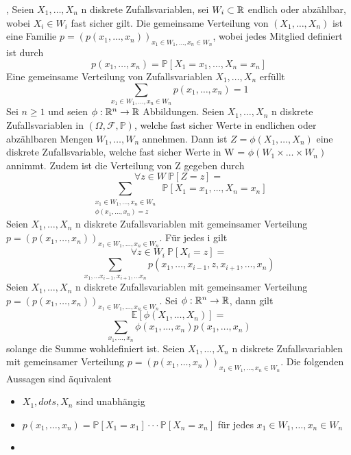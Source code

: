 \sep
\Def[5.1] \newline
Seien \(X_1, \dots , X_n\) n diskrete Zufallsvariablen, sei \( W_i \subset \mathbb{R} \) endlich oder abzählbar, wobei \(X_i \in W_i\) fast sicher gilt. Die gemeinsame Verteilung von \((X_1, \dots , X_n)\) ist eine Familie \( p = (p(x_1, \dots , x_n))_{x_1 \in W_1, \dots ,x_n \in W_n}\), wobei jedes Mitglied definiert ist durch \[ p(x_1, \dots , x_n) = \mathbb{P}[X_1 = x_1 , \dots , X_n = x_n]\]
\Satz[5.2] \newline
Eine gemeinsame Verteilung von Zufallsvariablen \( X_1, \dots , X_n\) erfüllt \[ \sum_{x_1 \in W_1, \dots , x_n \in W_n } p(x_1, \dots, x_n ) = 1\]
\Satz[5.3] \newline
Sei \( n \geq 1 \) und seien \( \phi : \mathbb{R}^n \rightarrow \mathbb{R} \) Abbildungen. Seien \(X_1, \dots, X_n\) n diskrete Zufallsvariablen in \( (\Omega, \mathcal{F}, \mathbb{P})\), welche fast sicher Werte in endlichen oder abzählbaren Mengen \(W_1, \dots , W_n\) annehmen. Dann ist \( Z = \phi(X_1, \dots , X_n)\) eine diskrete Zufallsvariable, welche fast sicher Werte in W = \(\phi(W_1 \times \dots \times W_n)\) annimmt. Zudem ist die Verteilung von Z gegeben durch \[ \forall z \in W \ \mathbb{P}[Z=z]= \] \[\sum_{\substack{x_1 \in W_1, \dots , x_n \in W_n \\ \phi(x_1, \dots , x_n) = z}} \ \mathbb{P}[X_1 = x_1 , \dots , X_n = x_n]\]
\Satz[5.4] \newline 
Seien \(X_1, \dots , X_n\) n diskrete Zufallsvariablen mit gemeinsamer Verteilung \( p = (p(x_1, \dots , x_n ))_{x_1 \in W_1, \dots , x_n \in W_n}\). Für jedes i gilt \[ \forall z \in W_i \ \mathbb{P}[X_i = z] =\] \[ \sum_{x_1, \dots x_{i-1}, x_{i+1}, \dots x_n} p(x_1, \dots , x_{i-1}, z , x_{i+1}, \dots , x_n)\]
\Satz[5.5] \newline
Seien \( X_1 , \dots , X_n \) n diskrete Zufallsvariablen mit gemeinsamer Verteilung \(p = (p(x_1, \dots , x_n))_{x_1 \in W_1, \dots , x_n \in W_n}\). Sei \(\phi: \mathbb{R}^n \rightarrow \mathbb{R} \), dann gilt \[ \mathbb{E}[\phi(X_1, \dots, X_n)] = \] \[\sum_{x_1, \dots , x_n } \phi(x_1, \dots , x_n)p(x_1, \dots , x_n)\] solange die Summe wohldefiniert ist. \newline
\Satz[5.6] \newline
Seien \(X_1, \dots , X_n\) n diskrete Zufallsvariablen mit gemeinsamer Verteilung \(p = (p(x_1, \dots , x_n))_{x_1 \in W_1 , \dots , x_n \in W_n}\). Die folgenden Aussagen sind äquivalent
\begin{itemize}
    \item \(X_1, dots , X_n\) sind unabhängig
    \item \(p(x_1, \dots , x_n ) = \mathbb{P}[X_1 = x_1 ] \cdot \cdot \cdot \mathbb{P}[X_n = x_n ]\) für jedes \(x_1 \in W_1 , \dots , x_n \in W_n\)
    \item 
\end{itemize}
